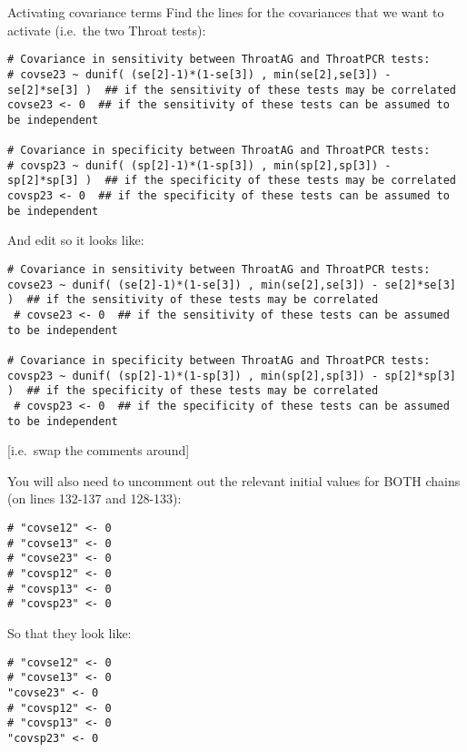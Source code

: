 \documentclass[
  ignorenonframetext,
  aspectratio=169,
]{beamer}
\begin{document}
\begin{frame}[fragile]{Activating covariance terms}
\protect\hypertarget{activating-covariance-terms}{}
Find the lines for the covariances that we want to activate (i.e.~the
two Throat tests):

\scriptsize

\begin{verbatim}
# Covariance in sensitivity between ThroatAG and ThroatPCR tests:
# covse23 ~ dunif( (se[2]-1)*(1-se[3]) , min(se[2],se[3]) - se[2]*se[3] )  ## if the sensitivity of these tests may be correlated
covse23 <- 0  ## if the sensitivity of these tests can be assumed to be independent

# Covariance in specificity between ThroatAG and ThroatPCR tests:
# covsp23 ~ dunif( (sp[2]-1)*(1-sp[3]) , min(sp[2],sp[3]) - sp[2]*sp[3] )  ## if the specificity of these tests may be correlated
covsp23 <- 0  ## if the specificity of these tests can be assumed to be independent
\end{verbatim}

\normalsize
\end{frame}

\begin{frame}[fragile]
And edit so it looks like:

\scriptsize

\begin{verbatim}
# Covariance in sensitivity between ThroatAG and ThroatPCR tests:
covse23 ~ dunif( (se[2]-1)*(1-se[3]) , min(se[2],se[3]) - se[2]*se[3] )  ## if the sensitivity of these tests may be correlated
 # covse23 <- 0  ## if the sensitivity of these tests can be assumed to be independent

# Covariance in specificity between ThroatAG and ThroatPCR tests:
covsp23 ~ dunif( (sp[2]-1)*(1-sp[3]) , min(sp[2],sp[3]) - sp[2]*sp[3] )  ## if the specificity of these tests may be correlated
 # covsp23 <- 0  ## if the specificity of these tests can be assumed to be independent
\end{verbatim}

\normalsize

{[}i.e.~swap the comments around{]}
\end{frame}

\begin{frame}[fragile]
You will also need to uncomment out the relevant initial values for BOTH
chains (on lines 132-137 and 128-133):

\scriptsize

\begin{verbatim}
# "covse12" <- 0
# "covse13" <- 0
# "covse23" <- 0
# "covsp12" <- 0
# "covsp13" <- 0
# "covsp23" <- 0
\end{verbatim}

\normalsize

So that they look like:

\scriptsize

\begin{verbatim}
# "covse12" <- 0
# "covse13" <- 0
"covse23" <- 0
# "covsp12" <- 0
# "covsp13" <- 0
"covsp23" <- 0
\end{verbatim}

\normalsize
\end{frame}
\end{document}
